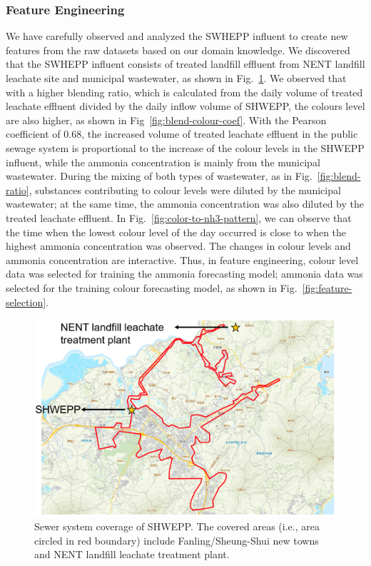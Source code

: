 \subsubsection{Feature Engineering}
We have carefully observed and analyzed the SWHEPP influent to create new features from the raw datasets based on our domain knowledge. We discovered that the SWHEPP influent consists of treated landfill effluent from NENT landfill leachate site and municipal wastewater, as shown in Fig.~\ref{fig:geomap}. We observed that with a higher blending ratio, which is calculated from the daily volume of treated leachate effluent divided by the daily inflow volume of SHWEPP, the colours level are also higher, as shown in Fig~\ref{fig:blend-colour-coef}. With the Pearson coefficient of 0.68, the increased volume of treated leachate effluent in the public sewage system is proportional to the increase of the colour levels in the SHWEPP influent, while the ammonia concentration is mainly from the municipal wastewater. During the mixing of both types of wastewater, as in Fig.~\ref{fig:blend-ratio}, substances contributing to colour levels were diluted by the municipal wastewater; at the same time, the ammonia concentration was also diluted by the treated leachate effluent. In Fig.~\ref{fig:color-to-nh3-pattern}, we can observe that the time when the lowest colour level of the day occurred is close to when the highest ammonia concentration was observed. The changes in colour levels and ammonia concentration are interactive. Thus, in feature engineering, colour level data was selected for training the ammonia forecasting model; ammonia data was selected for the training colour forecasting model, as shown in Fig.~\ref{fig:feature-selection}.

\begin{figure}[!ht]
    \centering
    \includegraphics[width=0.95\columnwidth]{imgs/pre-processing/geomap.png}
    \caption{Sewer system coverage of SHWEPP. The covered areas (i.e., area circled in red boundary) include Fanling/Sheung-Shui new towns and NENT landfill leachate treatment plant.}
    \label{fig:geomap}
 \end{figure}


